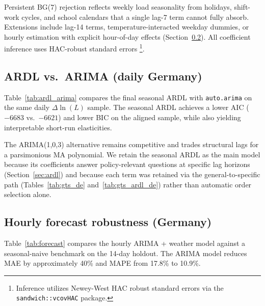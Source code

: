 \documentclass[12pt,a4paper]{article}
\begin{document}
\noindent Persistent BG(7) rejection reflects weekly load seasonality from holidays, shift-work cycles, and school calendars that a single lag-7 term cannot fully absorb. Extensions include lag-14 terms, temperature-interacted weekday dummies, or hourly estimation with explicit hour-of-day effects (Section~\ref{sec:forecast-results}). All coefficient inference uses HAC-robust standard errors \footnote{Inference utilizes Newey-West HAC robust standard errors via the \texttt{sandwich::vcovHAC} package.}.

\subsection{ARDL vs.\ ARIMA (daily Germany)}
\label{sec:ardl-arima-results}

Table~\ref{tab:ardl_arima} compares the final seasonal ARDL with \texttt{auto.arima} on the same daily $\Delta\ln(L)$ sample. The seasonal ARDL achieves a lower AIC ($-6683$ vs.\ $-6621$) and lower BIC on the aligned sample, while also yielding interpretable short-run elasticities.

\noindent The ARIMA(1,0,3) alternative remains competitive and trades structural lags for a parsimonious MA polynomial. We retain the seasonal ARDL as the main model because its coefficients answer policy-relevant questions at specific lag horizons (Section~\ref{sec:ardl}) and because each term was retained via the general-to-specific path (Tables~\ref{tab:gts_de} and~\ref{tab:gts_ardl_de}) rather than automatic order selection alone.

\begin{table}[H]
  \centering
  \caption{Daily ARDL vs.\ ARIMA - Germany (same $\Delta\ln(L)$ sample)}
  \label{tab:ardl_arima}
  
\end{table}

\subsection{Hourly forecast robustness (Germany)}
\label{sec:forecast-results}

Table~\ref{tab:forecast} compares the hourly ARIMA + weather model against a seasonal-naive benchmark on the 14-day holdout. The ARIMA model reduces MAE by approximately 40\% and MAPE from 17.8\% to 10.9\%.

\begin{table}[H]
  \centering
  \caption{Out-of-sample forecast accuracy: DE hourly load (14-day holdout, MW levels)}
  \label{tab:forecast}
  
\end{table}
\end{document}
